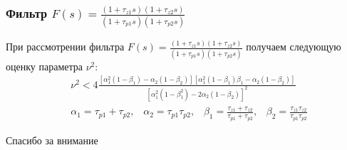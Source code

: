\documentclass{beamer}
\begin{document}

\begin{frame}
\frametitle{Фильтр $F(s) = \frac{(1+\tau_{z1}s)(1+\tau_{z2}s)}{(1+\tau_{p1}s)(1+\tau_{p2}s)}$}
При рассмотрении фильтра $F(s) = \frac{(1+\tau_{z1}s)(1+\tau_{z2}s)}{(1+\tau_{p1}s)(1+\tau_{p2}s)}$  получаем следующую оценку параметра $\nu^2$:
 \begin{equation*}
 \begin{aligned}
&\nu^2 < 4\frac{[\alpha_1^2(1-\beta_1) - \alpha_2(1-\beta_2)][\alpha_1^2(1-\beta_1)\beta_1 - \alpha_2(1-\beta_2)]}{[\alpha_1^2(1-\beta_1^2) - 2\alpha_2(1-\beta_2)]^2}\\
&\alpha_1 = \tau_{p1} + \tau_{p2}\text{,}\quad 
\alpha_2 = \tau_{p1}\tau_{p2}\text{,}\quad 
\beta_1 = \frac{\tau_{z1}+\tau_{z2}}{\tau_{p1}+\tau_{p2}}\text{,}\quad 
\beta_2 = \frac{\tau_{z1}\tau_{z2}}{\tau_{p1}\tau_{p2}}
 \end{aligned}
\end{equation*}
\end{frame}


\begin{frame}
\Huge{\centerline{Спасибо за внимание}}
\end{frame}

\end{document}

